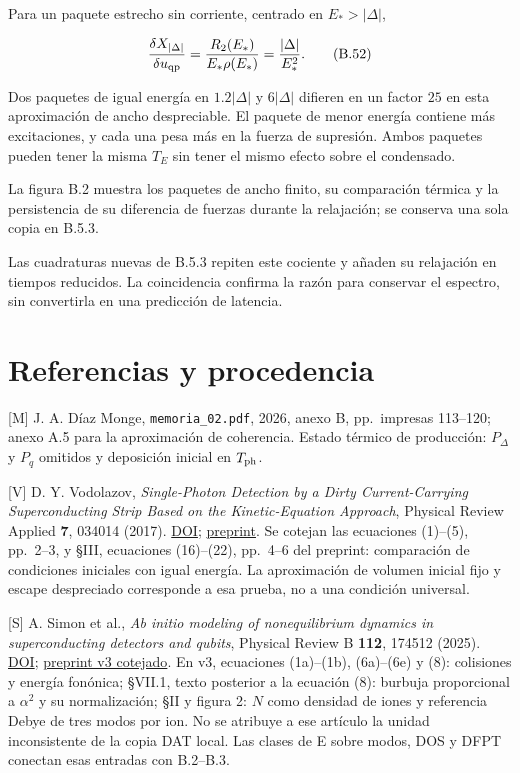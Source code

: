 \documentclass[
  spanish,
  10pt,
  a4paper,
]{article}
\newcounter{none} %
\begin{document}
Para un paquete estrecho sin corriente, centrado en \(E_*>|\Delta|\),

\[
\frac{\delta X_{|\Delta|}}{\delta u_{\rm qp}}
=\frac{R_2(E_*)}{E_*\rho(E_*)}
=\frac{|\Delta|}{E_*^2}.
\tag{B.52}
\]

Dos paquetes de igual energía en \(1.2|\Delta|\) y \(6|\Delta|\)
difieren en un factor \(25\) en esta aproximación de ancho despreciable.
El paquete de menor energía contiene más excitaciones, y cada una pesa
más en la fuerza de supresión. Ambos paquetes pueden tener la misma
\(T_E\) sin tener el mismo efecto sobre el condensado.

La figura B.2 muestra los paquetes de ancho finito, su comparación
térmica y la persistencia de su diferencia de fuerzas durante la
relajación; se conserva una sola copia en B.5.3.

Las cuadraturas nuevas de B.5.3 repiten este cociente y añaden su
relajación en tiempos reducidos. La coincidencia confirma la razón para
conservar el espectro, sin convertirla en una predicción de latencia.

\section{Referencias y procedencia}\label{referencias-y-procedencia}

{[}M{]} J. A. Díaz Monge, \nolinkurl{memoria_02.pdf}, 2026, anexo B,
pp.~impresas 113--120; anexo A.5 para la aproximación de coherencia.
Estado térmico de producción: \(P_\Delta\) y \(P_q\) omitidos y
deposición inicial en \(T_{\rm ph}\).

{[}V{]} D. Y. Vodolazov, \emph{Single-Photon Detection by a Dirty
Current-Carrying Superconducting Strip Based on the Kinetic-Equation
Approach}, Physical Review Applied \textbf{7}, 034014 (2017).
\href{https://doi.org/10.1103/PhysRevApplied.7.034014}{DOI};
\href{https://arxiv.org/pdf/1611.06060}{preprint}. Se cotejan las
ecuaciones (1)--(5), pp.~2--3, y §III, ecuaciones (16)--(22), pp.~4--6
del preprint: comparación de condiciones iniciales con igual energía. La
aproximación de volumen inicial fijo y escape despreciado corresponde a
esa prueba, no a una condición universal.

{[}S{]} A. Simon et al., \emph{Ab initio modeling of nonequilibrium
dynamics in superconducting detectors and qubits}, Physical Review B
\textbf{112}, 174512 (2025).
\href{https://doi.org/10.1103/3m2k-mzr6}{DOI};
\href{https://arxiv.org/html/2501.13791v3}{preprint v3 cotejado}. En v3,
ecuaciones (1a)--(1b), (6a)--(6e) y (8): colisiones y energía fonónica;
§VII.1, texto posterior a la ecuación (8): burbuja proporcional a
\(\alpha^2\) y su normalización; §II y figura 2: \(N\) como densidad de
iones y referencia Debye de tres modos por ion. No se atribuye a ese
artículo la unidad inconsistente de la copia DAT local. Las clases de E
sobre modos, DOS y DFPT conectan esas entradas con B.2--B.3.
\end{document}
